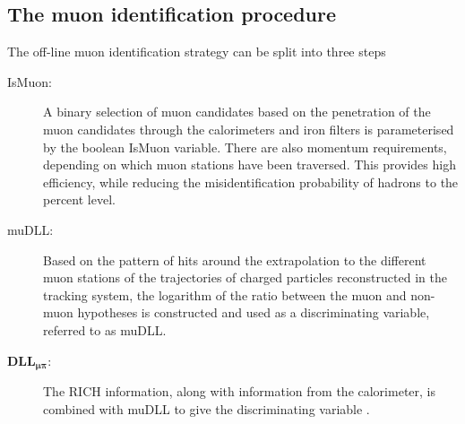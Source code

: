 \subsection{The muon identification procedure}
The  off-line muon identification strategy can be split into three steps \cite{muonID}
\begin{description}
  \item[IsMuon:] A binary selection of muon candidates based on the penetration of the muon candidates through the calorimeters and iron filters is parameterised by the boolean IsMuon variable. There are also momentum requirements, depending on which muon stations have been traversed.  This provides high efficiency, while reducing the misidentification probability of hadrons to the percent level.    
  \item[muDLL:] Based on the pattern of hits around the extrapolation to the different muon stations of the trajectories of charged particles reconstructed in the tracking system, the logarithm of the ratio between the muon and non-muon hypotheses is constructed and used as a discriminating variable, referred to as muDLL. %
  \item[$\mathbold{DLL_{\mu\pi}}$:] The RICH information, along with information from the calorimeter, is combined with muDLL to give the discriminating variable \dllmupi.
\end{description}


